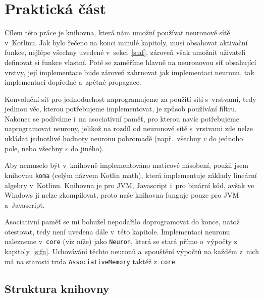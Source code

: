 \documentclass[12pt]{report}			%
\begin{document}
	\part{Praktická část}
			\noindent Cílem této práce je knihovna, která nám umožní používat neuronové sítě v~\gls{Kotlin}u. Jak bylo řečeno na konci minulé kapitoly, musí obsahovat aktivační funkce, nejlépe všechny uvedené v~sekci~\ref{s:af}, zároveň však umožnit uživateli definovat si funkce vlastní. Poté se zaměříme hlavně na neuronovou síť obsahující vrstvy, její implementace bude zároveň zahrnovat jak implementaci neuronu, tak implementaci dopředné a~zpětné propagace.
			
			Konvoluční síť pro jednoduchost naprogramujeme za použití sítí s~vrstvami, tedy jedinou věc, kterou potřebujeme implementovat, je způsob používání filtru. Nakonec se podíváme i~na asociativní paměť, pro kterou navíc potřebujeme naprogramovat neurony, jelikož na rozdíl od neuronové sítě s~vrstvami zde nelze ukládat jednotlivé hodnoty neuronu pohromadě (např.~všechny $v$ do jednoho pole, nebo všechny $\varepsilon$ do jiného).
		
			Aby nemuselo být v~knihovně implementováno maticové násobení, použil jsem knihovnu \verb!koma! (celým názvem Kotlin math), která implementuje základy lineární algebry v~\gls{Kotlin}u. Knihovna je pro \gls{JVM}, Javascript i~pro binární kód, avšak ve Windows ji nelze zkompilovat, proto naše knihovna funguje pouze pro \gls{JVM} a~Javascript. \autocite{online:Koma}
			
			\noindent\hrulefill
			
			Asociativní paměť se mi bohužel nepodařilo doprogramovat do konce, natož otestovat, tedy není uvedena dále v~této kapitole. Implementaci neuronu nalezneme v~\verb!core! (viz níže) jako  \verb!Neuron!, která se stará přímo o~výpočty z kapitoly~\ref{s:fn}. Uchovávání těchto neuronů a~spouštění výpočtů na každém z~nich má na starosti \gls{trida} \verb!AssociativeMemory! taktéž z~\verb!core!.
	
		\chapter{Struktura knihovny}
		
\end{document}
